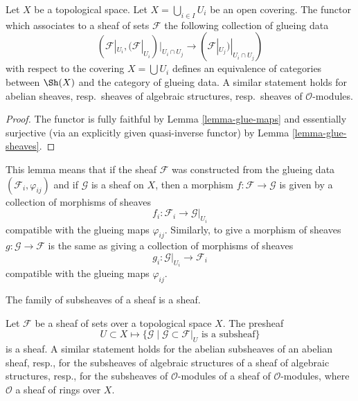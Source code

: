 \begin{lemma}
\label{lemma-mapping-property-glue}
Let $X$ be a topological space.
Let $X = \bigcup_{i\in I} U_i$ be an open covering.
The functor which associates to a sheaf of
sets $\mathcal{F}$ the following collection of
glueing data
$$
(\mathcal{F}|_{U_i},
(\mathcal{F}|_{U_i})|_{U_i \cap U_j}
\to
(\mathcal{F}|_{U_j})|_{U_i \cap U_j}
)
$$
with respect to the covering $X = \bigcup U_i$
defines an equivalence of categories between
$\Sh(X)$ and the category of glueing
data. A similar statement holds for
abelian sheaves, resp.\ sheaves of algebraic structures,
resp.\ sheaves of $\mathcal{O}$-modules.
\end{lemma}

\begin{proof}
The functor is fully faithful by
Lemma \ref{lemma-glue-maps}
and essentially surjective (via an explicitly given quasi-inverse functor) by
Lemma \ref{lemma-glue-sheaves}.
\end{proof}

\noindent
This lemma means that if the sheaf $\mathcal{F}$ was constructed
from the glueing data $(\mathcal{F}_i, \varphi_{ij})$
and if $\mathcal{G}$ is a sheaf on $X$, then a morphism
$f : \mathcal{F} \to \mathcal{G}$ is given by a collection of
morphisms of sheaves
$$
f_i : \mathcal{F}_i \longrightarrow \mathcal{G}|_{U_i}
$$
compatible with the glueing maps $\varphi_{ij}$. Similarly,
to give a morphism of sheaves $g : \mathcal{G} \to \mathcal{F}$
is the same as giving a collection of morphisms of sheaves
$$
g_i : \mathcal{G}|_{U_i} \longrightarrow \mathcal{F}_i
$$
compatible with the glueing maps $\varphi_{ij}$.

\begin{lemma}
	\label{lemma-sheaf-of-subsheaves}
	\begin{slogan}
		The family of subsheaves of a sheaf is a sheaf.
	\end{slogan}
	Let $\mathcal{F}$ be a sheaf of sets over a topological space $X$. The presheaf
	$$
	U\subset X\mapsto
	\{
	\mathcal{G}\mid\mathcal{G}\subset\mathcal{F}|_U\text{ is a subsheaf}
	\}
	$$
	is a sheaf. A similar statement holds for the abelian subsheaves of an abelian sheaf, resp., for the subsheaves of algebraic structures of a sheaf of algebraic structures, resp., for the subsheaves of $\mathcal{O}$-modules of a sheaf of $\mathcal{O}$-modules, where $\mathcal{O}$ a sheaf of rings over $X$.
\end{lemma}

